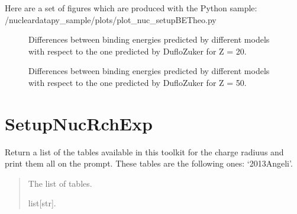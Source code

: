 \documentclass[letterpaper,10pt,english]{sphinxmanual}
\begin{document}
\sphinxAtStartPar
Here are a set of figures which are produced with the Python sample: /nucleardatapy\_sample/plots/plot\_nuc\_setupBETheo.py

\begin{figure}[htbp]
\centering
\capstart

\noindent{}
\caption{Differences between binding energies predicted by different models with respect to the one predicted by Duflo\sphinxhyphen{}Zuker for Z = 20.}\label{\detokenize{source/api/setup_nuc_be_theo:id1}}\end{figure}

\begin{figure}[htbp]
\centering
\capstart

\noindent{}
\caption{Differences between binding energies predicted by different models with respect to the one predicted by Duflo\sphinxhyphen{}Zuker for Z = 50.}\label{\detokenize{source/api/setup_nuc_be_theo:id2}}\end{figure}

\sphinxstepscope


\section{SetupNucRchExp}
\label{\detokenize{source/api/setup_nuc_rch_exp:setupnucrchexp}}\label{\detokenize{source/api/setup_nuc_rch_exp::doc}}\label{\detokenize{source/api/setup_nuc_rch_exp:module-nucleardatapy.nuc.setup_rch_exp}}

\begin{fulllineitems}
\label{\detokenize{source/api/setup_nuc_rch_exp:nucleardatapy.nuc.setup_rch_exp.rch_exp_tables}}
\pysigstartsignatures
{}
\pysigstopsignatures
\sphinxAtStartPar
Return a list of the tables available in this toolkit for the charge radiuus and
print them all on the prompt.  These tables are the following
ones: ‘2013\sphinxhyphen{}Angeli’.
\begin{quote}\begin{description}
\sphinxAtStartPar
The list of tables.

\sphinxAtStartPar
list{[}str{]}.

\end{description}\end{quote}

\end{fulllineitems}
\end{document}
